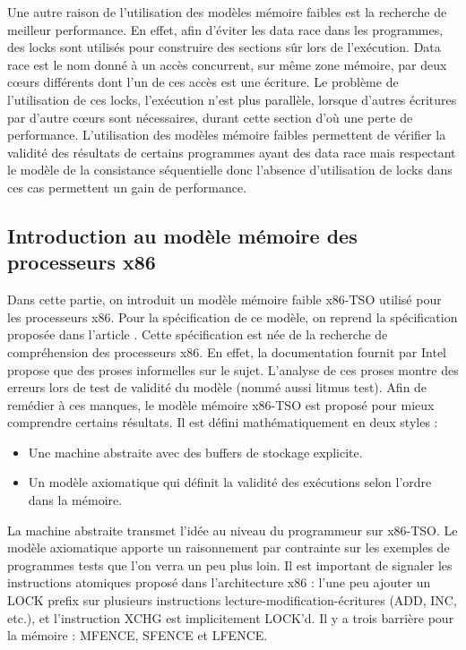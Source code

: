 \documentclass[12pt,a4paper]{article}
\begin{document}
Une autre raison de l'utilisation des modèles mémoire faibles est la recherche de meilleur performance. En effet, afin d'éviter les data race dans les programmes, des locks sont utilisés pour construire des sections sûr lors de l'exécution. Data race est le nom donné à un accès concurrent, sur même zone mémoire, par deux cœurs différents dont l'un de ces accès est une écriture. Le problème de l'utilisation de ces locks, l'exécution n'est plus parallèle, lorsque d'autres écritures par d'autre cœurs sont nécessaires, durant cette section d'où une perte de performance. L'utilisation des modèles mémoire faibles permettent de vérifier la validité des résultats de certains programmes ayant des data race mais respectant le modèle de la consistance séquentielle donc l'absence d'utilisation de locks dans ces cas permettent un gain de performance.  

\subsection{Introduction au modèle mémoire des processeurs x86}
 
Dans cette partie, on introduit un modèle mémoire faible x86-TSO utilisé pour les processeurs x86. Pour la spécification de ce modèle, on reprend la spécification proposée dans l'article \cite{Sewell:2010:XRU:1785414.1785443}. Cette spécification est née de la recherche de compréhension des processeurs x86. En effet, la documentation fournit par Intel propose que des proses informelles sur le sujet. L'analyse de ces proses montre des erreurs lors de test de validité du modèle (nommé aussi litmus test). Afin de remédier à ces manques, le modèle mémoire x86-TSO est proposé pour mieux comprendre certains résultats. Il est défini mathématiquement en deux styles :
\begin{itemize}
	\item Une machine abstraite avec des buffers de stockage explicite.
	\item Un modèle axiomatique qui définit la validité des exécutions selon l'ordre dans la mémoire. 
\end{itemize}
La machine abstraite transmet l'idée au niveau du programmeur sur x86-TSO. Le modèle axiomatique apporte un raisonnement par contrainte sur les exemples de programmes tests que l'on verra un peu plus loin. Il est important de signaler les instructions atomiques proposé dans l'architecture x86 : l'une peu ajouter un LOCK prefix sur plusieurs instructions lecture-modification-écritures (ADD, INC, etc.), et l'instruction XCHG est implicitement LOCK'd. Il y a trois barrière pour la mémoire : MFENCE, SFENCE et LFENCE.
\end{document}
